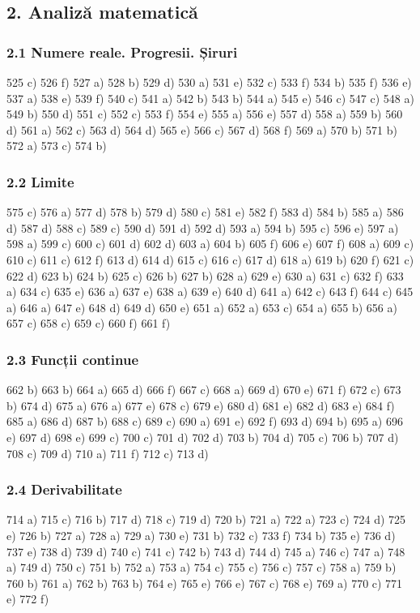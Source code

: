 \documentclass[11pt]{article}
\begin{document}
\subsection*{2. Analiză matematică}
\subsubsection*{2.1 Numere reale. Progresii. Șiruri}
525 c) 526 f) 527 a) 528 b) 529 d) 530 a) 531 e) 532 c) 533 f) 534 b) 535 f) 536 e) 537 a) 538 e) 539 f) 540 c) 541 a) 542 b) 543 b) 544 a) 545 e) 546 c) 547 c) 548 a) 549 b) 550 d) 551 c) 552 c) 553 f) 554 e) 555 a) 556 e) 557 d) 558 a) 559 b) 560 d) 561 a) 562 c) 563 d) 564 d) 565 e) 566 c) 567 d) 568 f) 569 a) 570 b) 571 b) 572 a) 573 c) 574 b)

\subsubsection*{2.2 Limite}
575 c) 576 a) 577 d) 578 b) 579 d) 580 c) 581 e) 582 f) 583 d) 584 b) 585 a) 586 d) 587 d) 588 c) 589 c) 590 d) 591 d) 592 d) 593 a) 594 b) 595 c) 596 e) 597 a) 598 a) 599 c) 600 c) 601 d) 602 d) 603 a) 604 b) 605 f) 606 e) 607 f) 608 a) 609 c) 610 c) 611 c) 612 f) 613 d) 614 d) 615 c) 616 c) 617 d) 618 a) 619 b) 620 f) 621 c) 622 d) 623 b) 624 b) 625 c) 626 b) 627 b) 628 a) 629 e) 630 a) 631 c) 632 f) 633 a) 634 c) 635 e) 636 a) 637 e) 638 a) 639 e) 640 d) 641 a) 642 c) 643 f) 644 c) 645 a) 646 a) 647 e) 648 d) 649 d) 650 e) 651 a) 652 a) 653 c) 654 a) 655 b) 656 a) 657 c) 658 c) 659 c) 660 f) 661 f)

\subsubsection*{2.3 Funcții continue}
662 b) 663 b) 664 a) 665 d) 666 f) 667 c) 668 a) 669 d) 670 e) 671 f) 672 c) 673 b) 674 d) 675 a) 676 a) 677 e) 678 c) 679 e) 680 d) 681 e) 682 d) 683 e) 684 f) 685 a) 686 d) 687 b) 688 c) 689 c) 690 a) 691 e) 692 f) 693 d) 694 b) 695 a) 696 e) 697 d) 698 e) 699 c) 700 c) 701 d) 702 d) 703 b) 704 d) 705 c) 706 b) 707 d) 708 c) 709 d) 710 a) 711 f) 712 c) 713 d)

\subsubsection*{2.4 Derivabilitate}
714 a) 715 c) 716 b) 717 d) 718 c) 719 d) 720 b) 721 a) 722 a) 723 c) 724 d) 725 e) 726 b) 727 a) 728 a) 729 a) 730 e) 731 b) 732 c) 733 f) 734 b) 735 e) 736 d) 737 e) 738 d) 739 d) 740 c) 741 c) 742 b) 743 d) 744 d) 745 a) 746 c) 747 a) 748 a) 749 d) 750 c) 751 b) 752 a) 753 a) 754 c) 755 c) 756 c) 757 c) 758 a) 759 b) 760 b) 761 a) 762 b) 763 b) 764 e) 765 e) 766 e) 767 c) 768 e) 769 a) 770 c) 771 e) 772 f)
\end{document}
